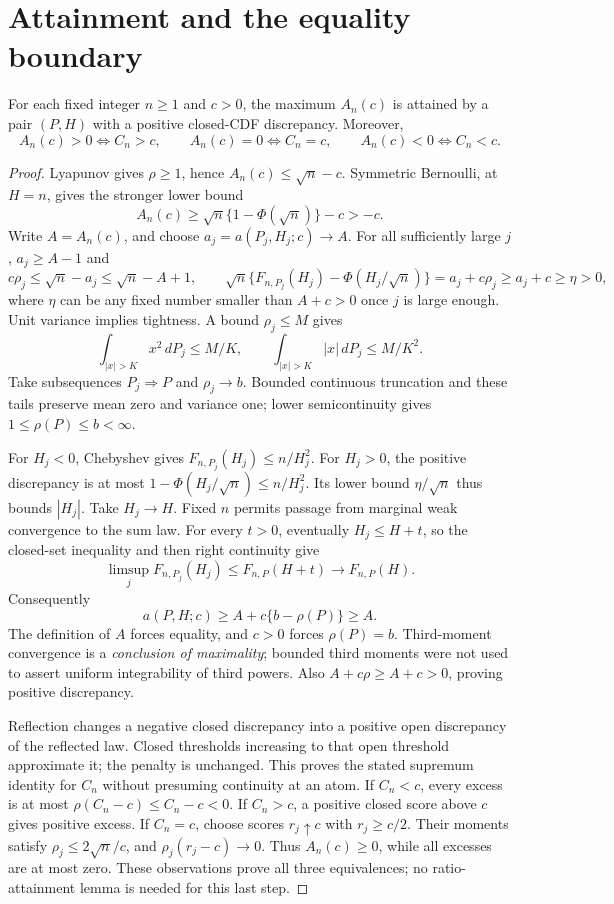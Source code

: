 \section{Attainment and the equality boundary}
\begin{theorem}\label{v4excess:thm:attain}
For each fixed integer $n\ge1$ and $c>0$, the maximum $A_n(c)$ is
attained by a pair $(P,H)$ with a positive closed-CDF discrepancy.
Moreover,
\[
 A_n(c)>0\iff C_n>c,\qquad
 A_n(c)=0\iff C_n=c,\qquad A_n(c)<0\iff C_n<c.
\]
\end{theorem}
\begin{proof}
Lyapunov gives $\rho\ge1$, hence $A_n(c)\le\sqrt n-c$. Symmetric
Bernoulli, at $H=n$, gives the stronger lower bound
\[
 A_n(c)\ge\sqrt n\{1-\Phi(\sqrt n)\}-c>-c.
\]
Write $A=A_n(c)$, and choose $a_j=a(P_j,H_j;c)\to A$. For all sufficiently
large $j$, $a_j\ge A-1$ and
\[
 c\rho_j\le\sqrt n-a_j\le\sqrt n-A+1,
 \qquad \sqrt n\{F_{n,P_j}(H_j)-\Phi(H_j/\sqrt n)\}
       =a_j+c\rho_j\ge a_j+c\ge\eta>0,
\]
where $\eta$ can be any fixed number smaller than $A+c>0$ once $j$ is
large enough. Unit variance implies tightness. A bound $\rho_j\le M$
gives
\[
 \int_{|x|>K}x^2\,dP_j\le M/K,
 \qquad\int_{|x|>K}|x|\,dP_j\le M/K^2.
\]
Take subsequences $P_j\Rightarrow P$ and $\rho_j\to b$. Bounded continuous
truncation and these tails preserve mean zero and variance one;
lower semicontinuity gives $1\le\rho(P)\le b<\infty$.

For $H_j<0$, Chebyshev gives $F_{n,P_j}(H_j)\le n/H_j^2$.
For $H_j>0$, the positive discrepancy is at most
$1-\Phi(H_j/\sqrt n)\le n/H_j^2$. Its lower bound $\eta/\sqrt n$ thus
bounds $|H_j|$. Take $H_j\to H$. Fixed $n$ permits passage from marginal
weak convergence to the sum law. For every $t>0$, eventually
$H_j\le H+t$, so the closed-set inequality and then right continuity give
\[
 \limsup_j F_{n,P_j}(H_j)\le F_{n,P}(H+t)
       \longrightarrow F_{n,P}(H).
\]
Consequently
\[
 a(P,H;c)\ge A+c\{b-\rho(P)\}\ge A.
\]
The definition of $A$ forces equality, and $c>0$ forces $\rho(P)=b$.
Third-moment convergence is a \emph{conclusion of maximality}; bounded
third moments were not used to assert uniform integrability of third
powers. Also $A+c\rho\ge A+c>0$, proving positive discrepancy.

Reflection changes a negative closed discrepancy into a positive open
discrepancy of the reflected law. Closed thresholds increasing to that
open threshold approximate it; the penalty is unchanged. This proves
the stated supremum identity for $C_n$ without presuming continuity at an
atom. If $C_n<c$, every excess is at most
$\rho(C_n-c)\le C_n-c<0$. If $C_n>c$, a positive closed score above $c$
gives positive excess. If $C_n=c$, choose scores $r_j\uparrow c$ with
$r_j\ge c/2$. Their moments satisfy $\rho_j\le2\sqrt n/c$, and
$\rho_j(r_j-c)\to0$. Thus $A_n(c)\ge0$, while all excesses are at most
zero. These observations prove all three equivalences; no ratio-attainment
lemma is needed for this last step.
\end{proof}


